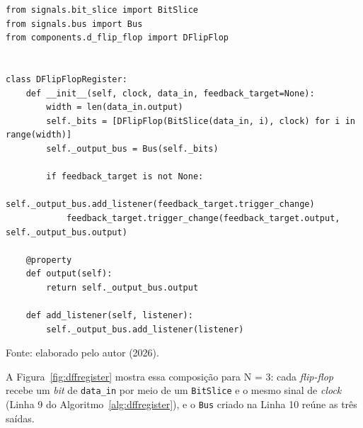 \begin{algoritmo}[H]
\caption{DFlipFlopRegister (components/d\_flip\_flop\_register.py).}
\label{alg:dffregister}
\begin{verbatim}
from signals.bit_slice import BitSlice
from signals.bus import Bus
from components.d_flip_flop import DFlipFlop


class DFlipFlopRegister:
    def __init__(self, clock, data_in, feedback_target=None):
        width = len(data_in.output)
        self._bits = [DFlipFlop(BitSlice(data_in, i), clock) for i in range(width)]
        self._output_bus = Bus(self._bits)

        if feedback_target is not None:
            self._output_bus.add_listener(feedback_target.trigger_change)
            feedback_target.trigger_change(feedback_target.output, self._output_bus.output)

    @property
    def output(self):
        return self._output_bus.output

    def add_listener(self, listener):
        self._output_bus.add_listener(listener)
\end{verbatim}
\begin{center}
\footnotesize Fonte: elaborado pelo autor (2026).
\end{center}
\end{algoritmo}

A Figura~\ref{fig:dffregister} mostra essa composição para N = 3: cada \textit{flip-flop} recebe um \textit{bit} de \texttt{data\_in} por meio de um \texttt{BitSlice} e o mesmo sinal de \textit{clock} (Linha 9 do Algoritmo~\ref{alg:dffregister}), e o \texttt{Bus} criado na Linha 10 reúne as três saídas.

